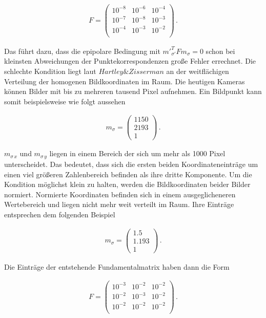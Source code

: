 \begin{gather}
	F = \begin{pmatrix}
		10^{-8}&10^{-6}&10^{-4}\\
		10^{-7}&10^{-8}&10^{-3}\\
		10^{-4}&10^{-3}&10^{-2}\\
	\end{pmatrix}\, .
\end{gather}

Das führt dazu, dass die epipolare Bedingung mit $m'^T_{\sigma'}Fm_\sigma = 0$ schon bei kleinsten Abweichungen der Punktekorrespondenzen große Fehler errechnet. Die schlechte Kondition liegt laut $Hartley \& Zisserman$ an der weitflächigen Verteilung der homogenen Bildkoordinaten im Raum. Die heutigen Kameras können Bilder mit bis zu mehreren tausend Pixel aufnehmen. Ein Bildpunkt kann somit beispielsweise wie folgt aussehen

\begin{gather}
	m_\sigma = \begin{pmatrix}
		1150\\2193\\1
	\end{pmatrix} \, .
\end{gather}

$m_{\sigma\, x}$ und $m_{\sigma\, y}$ liegen in einem Bereich der sich um mehr als 1000 Pixel unterscheidet. Das bedeutet, dass sich die ersten beiden Koordinateneinträge um einen viel größeren Zahlenbereich befinden als ihre dritte Komponente. Um die Kondition möglichst klein zu halten, werden die Bildkoordinaten beider Bilder normiert\cite{HZ8,Brooks}. Normierte Koordinaten befinden sich in einem ausgeglicheneren Wertebereich und liegen nicht mehr weit verteilt im Raum\cite{HZ8}. Ihre Einträge entsprechen dem folgenden Beispiel

 \begin{gather}
 	m_\sigma = \begin{pmatrix}
 		1.5\\1.193\\1
 	\end{pmatrix} \, .
 \end{gather}

Die Einträge der entstehende Fundamentalmatrix haben dann die Form

\begin{gather}
	F = \begin{pmatrix}
		10^{-3}&10^{-2}&10^{-2}\\
		10^{-2}&10^{-3}&10^{-2}\\
		10^{-2}&10^{-2}&10^{-2}\\
	\end{pmatrix} \, .
\end{gather}

